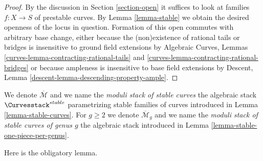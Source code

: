 \begin{proof}
By the discussion in Section \ref{section-open}
it suffices to look at families $f : X \to S$ of
prestable curves. By Lemma \ref{lemma-stable}
we obtain the desired openness of the locus in question.
Formation of this open commutes with arbitrary base change,
either because the (non)existence of rational tails or bridges
is insensitive to ground field extensions by
Algebraic Curves, Lemmas
\ref{curves-lemma-contracting-rational-tails} and
\ref{curves-lemma-contracting-rational-bridges}
or because ampleness is insensitive to base field extensions by
Descent, Lemma \ref{descent-lemma-descending-property-ample}.
\end{proof}

\begin{definition}
\label{definition-deligne-mumford}
\begin{reference}
\cite{DM}
\end{reference}
We denote $\overline{\mathcal{M}}$ and we name the
{\it moduli stack of stable curves} the algebraic stack
$\Curvesstack^{stable}$ parametrizing stable families of curves
introduced in Lemma \ref{lemma-stable-curves}.
For $g \geq 2$ we denote $\overline{\mathcal{M}}_g$ and we name the
{\it moduli stack of stable curves of genus $g$}
the algebraic stack introduced in Lemma \ref{lemma-stable-one-piece-per-genus}.
\end{definition}

\noindent
Here is the obligatory lemma.

